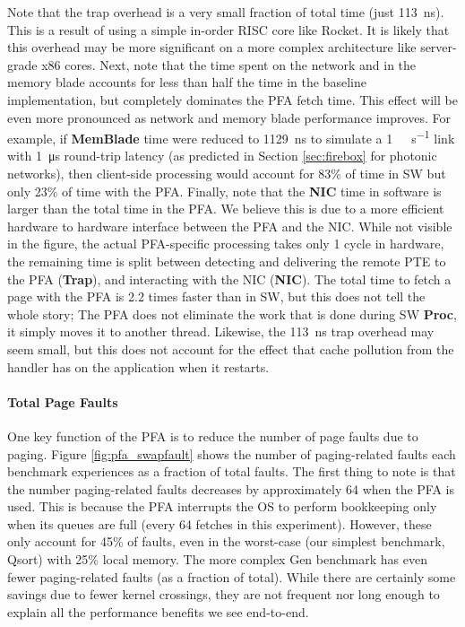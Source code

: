   Note that the trap overhead is a very small fraction of total time (just
  \SI{113}{\nano\second}). This is a result of using a simple in-order RISC
  core like Rocket. It is likely that this overhead may be more significant on
  a more complex architecture like server-grade x86 cores. Next, note that the
  time spent on the network and in the memory blade accounts for less than half
  the time in the baseline implementation, but completely dominates the PFA
  fetch time. This effect will be even more pronounced as network and memory
  blade performance improves. For example, if \textbf{MemBlade} time were
  reduced to \SI{1129}{\nano\second} to simulate a \SI{1}{\tera\bit\per\second}
  link with \SI{1}{\micro\second} round-trip latency (as predicted in Section
  \ref{sec:firebox} for photonic networks), then client-side processing would
  account for 83\% of time in SW but only 23\% of time with the PFA. Finally,
  note that the \textbf{NIC} time in software is larger than the total time in
  the PFA. We believe this is due to a more efficient hardware to hardware
  interface between the PFA and the NIC. While not visible in the figure, the
  actual PFA-specific processing takes only 1 cycle in hardware, the remaining
  time is split between detecting and delivering the remote PTE to the PFA
  (\textbf{Trap}), and interacting with the NIC (\textbf{NIC}). The total time
  to fetch a page with the PFA is 2.2 times faster than in SW, but this does
  not tell the whole story; The PFA does not eliminate the work that is done
  during SW \textbf{Proc}, it simply moves it to another thread. Likewise, the
  \SI{113}{\nano\second} trap overhead may seem small, but this does not
  account for the effect that cache pollution from the handler has on the
  application when it restarts.

  \paragraph{Total Page Faults}
  One key function of the PFA is to reduce the number of page faults due to
  paging. Figure \ref{fig:pfa_swapfault} shows the number of paging-related
  faults each benchmark experiences as a fraction of total faults. The first
  thing to note is that the number paging-related faults decreases by
  approximately 64 when the PFA is used. This is because the PFA interrupts the
  OS to perform bookkeeping only when its queues are full (every 64 fetches in
  this experiment). However, these only account for 45\% of faults, even in the
  worst-case (our simplest benchmark, Qsort) with 25\% local memory. The more
  complex Gen benchmark has even fewer paging-related faults (as a fraction of
  total). While there are certainly some savings due to fewer kernel crossings,
  they are not frequent nor long enough to explain all the performance benefits
  we see end-to-end.
 
